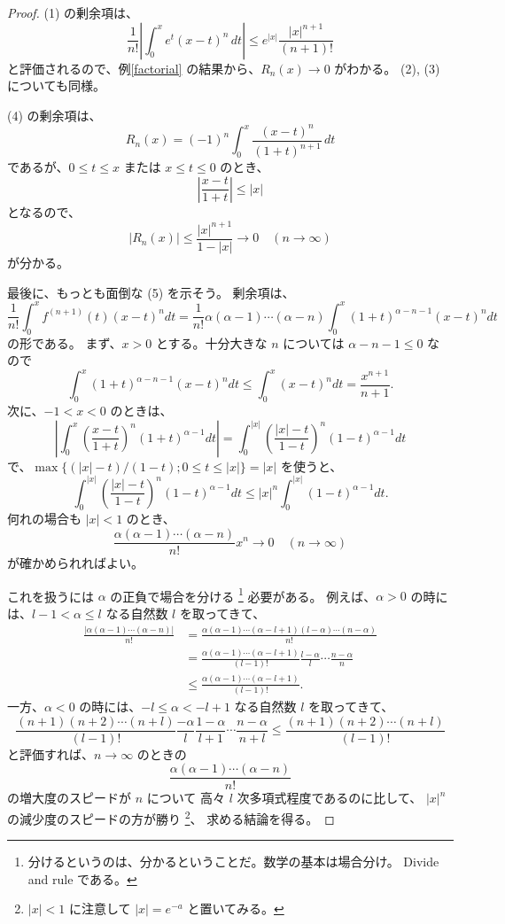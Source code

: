 \documentclass[a4paper]{jsarticle}
\theoremstyle{definition}
\theoremstyle{remark}
\begin{document}
\begin{proof}
(1) の剰余項は、
\[
\frac{1}{n!} \left| \int_0^x e^t (x-t)^n\, dt \right| 
\leq e^{|x|} \frac{|x|^{n+1}}{(n+1)!} 
\]
と評価されるので、例\ref{factorial} の結果から、$R_n(x) \to 0$ がわかる。
(2), (3) についても同様。

(4) の剰余項は、
\[
R_n(x) = (-1)^n \int_0^x \frac{(x-t)^n}{(1+t)^{n+1}}\, dt
\]
であるが、$0 \leq t \leq x$ または $x \leq t \leq 0$ のとき、
\[
\left| \frac{x-t}{1+t} \right| \leq |x|
\]
となるので、
\[
|R_n(x)| \leq \frac{|x|^{n+1}}{1-|x|} \to 0 
\quad 
(n \to \infty)
\]
が分かる。

最後に、もっとも面倒な (5) を示そう。
剰余項は、
\[
\frac{1}{n!} \int_0^x f^{(n+1)}(t)(x-t)^n dt
= \frac{1}{n!}\alpha(\alpha-1)\cdots(\alpha -n)
\int_0^x(1+t)^{\alpha-n-1}(x-t)^n dt
\]
の形である。
まず、$x>0$ とする。十分大きな $n$ については $\alpha - n -1 \leq 0$ な
ので
\[
\int_0^x (1+t)^{\alpha - n -1} (x-t)^n dt
\leq \int_0^{x} (x-t)^n dt
= \frac{x^{n+1}}{n+1}. 
\]
次に、$-1<x<0$ のときは、
\[
\left|
\int_0^x \left( \frac{x-t}{1+t} \right)^n (1+t)^{\alpha -1} dt
\right|
= \int_0^{|x|} \left( \frac{|x|-t}{1-t} \right)^n (1-t)^{\alpha -1}
dt
\]
で、$\max\{ (|x|-t)/(1-t); 0 \leq t \leq |x| \} = |x|$ を使うと、
\[
\int_0^{|x|} \left( \frac{|x|-t}{1-t} \right)^n (1-t)^{\alpha -1}
dt \leq |x|^n \int_0^{|x|} (1-t)^{\alpha -1}dt. 
\]
何れの場合も $|x| < 1$ のとき、
\[
\frac{\alpha(\alpha-1)\cdots(\alpha-n)}{n!} x^n \to 0 
\quad(n \to \infty)
\]
が確かめられればよい。

これを扱うには $\alpha$ の正負で場合を分ける
\footnote{分けるというのは、分かるということだ。数学の基本は場合分け。
Divide and rule である。}
必要がある。
例えば、$\alpha>0$ の時には、$l-1<\alpha\leq l$ なる自然数 $l$ を取ってきて、
\begin{align*}
\frac{|\alpha(\alpha-1)\cdots(\alpha -n)|}{n!}
&=
\frac{\alpha(\alpha-1)\cdots(\alpha-l+1)(l-\alpha)\cdots(n-\alpha)}{n!}\\
&= \frac{\alpha(\alpha-1)\cdots(\alpha-l+1)}{(l-1)!}
\frac{l-\alpha}{l} \cdots \frac{n-\alpha}{n}\\
&\leq \frac{\alpha(\alpha-1)\cdots(\alpha-l+1)}{(l-1)!}.
\end{align*}
一方、$\alpha<0$ の時には、$-l\leq \alpha<-l+1$ なる自然数 $l$ を取ってきて、
\[
\frac{(n+1)(n+2)\cdots(n+l)}{(l-1)!}
\frac{-\alpha}{l} \frac{1-\alpha}{l+1} \cdots \frac{n-\alpha}{n+l}
\leq
\frac{(n+1)(n+2)\cdots(n+l)}{(l-1)!}
\]
と評価すれば、$n \to \infty$ のときの
\[
\frac{\alpha(\alpha-1)\cdots(\alpha-n)}{n!}
\]
の増大度のスピードが $n$ について 高々 $l$ 次多項式程度であるのに比して、
$|x|^n$ の減少度のスピードの方が勝り
\footnote{$|x| < 1$ に注意して $|x| = e^{-a}$ と置いてみる。}、
求める結論を得る。
\end{proof}
\end{document}
